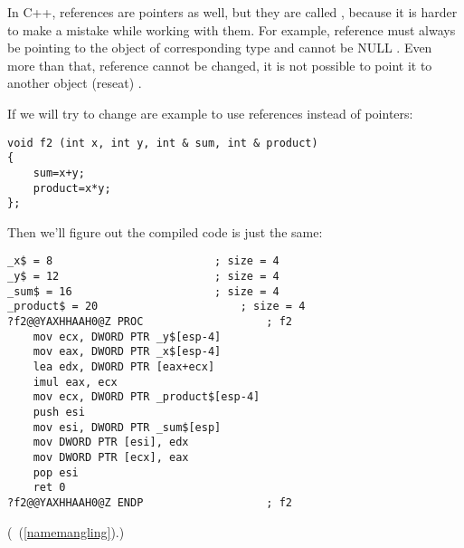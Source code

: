 {In C++, references are pointers as well, but they are called , because it is harder to make a mistake while
working with them}\cite[8.3.2]{CPP11}.
{For example, reference must always be pointing to the object of corresponding type and cannot be NULL}
\cite[8.6]{ParashiftCPPFAQ}.
{Even more than that, reference cannot be changed, it is not possible to point it to another object (reseat)}
\cite[8.5]{ParashiftCPPFAQ}.

{If we will try to change are example to use references instead of pointers:}

\begin{lstlisting}
void f2 (int x, int y, int & sum, int & product)
{
	sum=x+y;
	product=x*y;
};
\end{lstlisting}

{Then we'll figure out the compiled code is just the same:}

\begin{lstlisting}[caption=\Optimizing MSVC 2010]
_x$ = 8							; size = 4
_y$ = 12						; size = 4
_sum$ = 16						; size = 4
_product$ = 20						; size = 4
?f2@@YAXHHAAH0@Z PROC					; f2
	mov	ecx, DWORD PTR _y$[esp-4]
	mov	eax, DWORD PTR _x$[esp-4]
	lea	edx, DWORD PTR [eax+ecx]
	imul eax, ecx
	mov ecx, DWORD PTR _product$[esp-4]
	push esi
	mov	esi, DWORD PTR _sum$[esp]
	mov	DWORD PTR [esi], edx
	mov	DWORD PTR [ecx], eax
	pop	esi
	ret	0
?f2@@YAXHHAAH0@Z ENDP					; f2
\end{lstlisting}

(~(\ref{namemangling}).)

